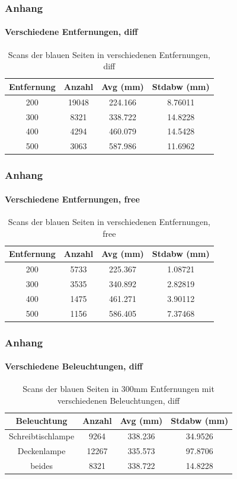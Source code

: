 \documentclass[xcolor=dvipsnames]{beamer}
\begin{document}
\begin{frame}[noframenumbering]
	\frametitle{Anhang}
	\framesubtitle{Verschiedene Entfernungen, diff}
	\begin{table}
		\begin{tabular}{c|c|c|c}
			Entfernung & Anzahl & Avg (mm) & Stdabw (mm) \\
			\hline
			200 & 19048 & 224.166 & 8.76011 \\
			300 & 8321 & 338.722 & 14.8228 \\
			400 & 4294 & 460.079 & 14.5428 \\
			500 & 3063 & 587.986 & 11.6962 \\
		\end{tabular}
		\caption{Scans der blauen Seiten in verschiedenen Entfernungen, diff}
	\end{table}
\end{frame}


\begin{frame}[noframenumbering]
	\frametitle{Anhang}
	\framesubtitle{Verschiedene Entfernungen, free}
	\begin{table}
		\begin{tabular}{c|c|c|c}
			Entfernung & Anzahl & Avg (mm) & Stdabw (mm) \\
			\hline
			200 & 5733 & 225.367 & 1.08721 \\
			300 & 3535 & 340.892 & 2.82819 \\
			400 & 1475 & 461.271 & 3.90112 \\
			500 & 1156 & 586.405 & 7.37468 \\
		\end{tabular}
		\caption{Scans der blauen Seiten in verschiedenen Entfernungen, free}
	\end{table}
\end{frame}


\begin{frame}[noframenumbering]
	\frametitle{Anhang}
	\framesubtitle{Verschiedene Beleuchtungen, diff}
	\begin{table}
		\begin{tabular}{c|c|c|c}
			Beleuchtung & Anzahl & Avg (mm) & Stdabw (mm) \\
			\hline
			Schreibtischlampe & 9264 & 338.236 & 34.9526 \\
			Deckenlampe & 12267 & 335.573 & 97.8706 \\
			beides & 8321 & 338.722 & 14.8228 \\
		\end{tabular}
		\caption{Scans der blauen Seiten in 300mm Entfernungen mit verschiedenen Beleuchtungen, diff}
	\end{table}
\end{frame}
\end{document}
